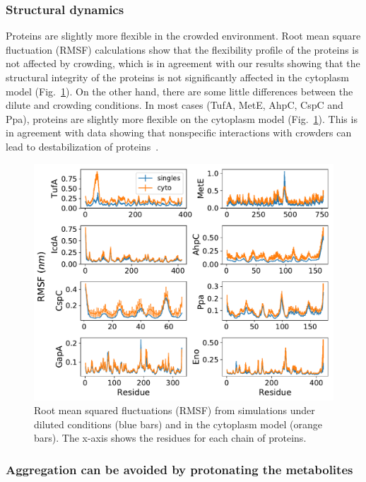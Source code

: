 \documentclass[journal=jacsat,manuscript=article]{achemso}
\begin{document}
\subsubsection{Structural dynamics}
Proteins are slightly more flexible in the crowded environment. Root mean square fluctuation (RMSF) calculations show that the flexibility profile of the proteins is not affected by crowding, which is in agreement with our results showing that the structural integrity of the proteins is not significantly affected in the cytoplasm model (Fig.~\ref{fig:rmsf}). On the other hand, there are some little differences between the dilute and crowding conditions. In most cases (TufA, MetE, AhpC, CspC and Ppa), proteins are slightly more flexible on the cytoplasm model (Fig.~\ref{fig:rmsf}). This is in agreement with data showing that nonspecific interactions with crowders can lead to destabilization of proteins~\cite{Feig2011, miklos2011, Wang2012b}.


\begin{figure}[H]
\includegraphics[scale=0.5]{rmsf.pdf}
\caption{Root mean squared fluctuations (RMSF) from simulations under diluted conditions (blue bars) and in the cytoplasm model (orange bars). The x-axis shows the residues for each chain of proteins.}
\label{fig:rmsf}
\end{figure}






\subsubsection{Aggregation can be avoided by protonating the metabolites}
\end{document}
